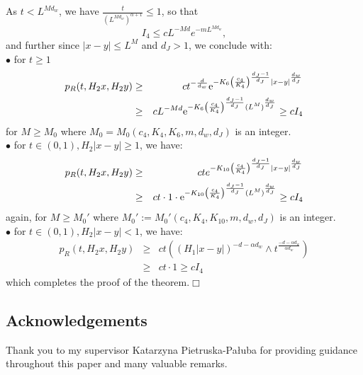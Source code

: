 \documentclass[11pt]{article}
\begin{document}
As $t < L^{Md_{w}}$, we have $\frac{t}{(L^{Md_{w}})^{\alpha + 1}} \leq 1$, so that
$$
I_4 \leq cL^{-Md}e^{-mL^{Md_w}},
$$
and further since $|x-y| \leq L^{M}$ and $d_J > 1$, we conclude with:\\
$\bullet$ for $ t\geq 1$
\begin{eqnarray*}
p_R(t,H_2x,H_2y) & \geq & ct^{-\frac{d}{d_{w}}}{\rm e}^{-K_6\left(\frac{c_4}{K_4}\right)^{\frac{d_J-1}{d_J}}|x-y|^{\frac{d_{w}}{d_{J}}}}\\
 & \geq & cL^{-Md}{\rm e}^{-K_6\left(\frac{c_4}{K_4}\right)^{\frac{d_J-1}{d_J}}(L^{M})^{\frac{d_{w}}{d_{J}}}}  \geq  cI_4
\end{eqnarray*}
for  $M \geq M_0$ where $M_0 = M_0(c_4, K_4, K_6, m, d_w, d_J)$ is an integer.\\
$\bullet$ for $ t \in (0,1), H_2|x-y| \geq 1$, we have:
\begin{eqnarray*}
p_R(t,H_2x,H_2y) & \geq & cte^{-K_{10}\left(\frac{c_4}{K_4}\right)^{\frac{d_J-1}{d_J}}|x-y|^{\frac{d_{w}}{d_{J}}}}\\
 & \geq & ct\cdot 1 \cdot {\rm e}^{-K_{10}\left(\frac{c_4}{K_4}\right)^{\frac{d_J-1}{d_J}}(L^{M})^{\frac{d_{w}}{d_{J}}}}  \geq  cI_4
\end{eqnarray*}
again, for $M \geq M_0'$ where $M_0' := M_0'(c_4, K_4, K_{10}, m, d_w, d_J)$ is an integer.\\
$\bullet$ for $ t \in (0,1), H_2|x-y| < 1$, we have:
\begin{eqnarray*}
p_R(t,H_2x,H_2y) & \geq & ct((H_1|x-y|)^{-d -\alpha d_{w}} \wedge t^{\frac{-d-\alpha d_{w}}{\alpha d_{w}}})\\
 & \geq & ct\cdot 1  \geq  cI_4
\end{eqnarray*}
which completes the proof of the theorem.\hfill$\Box$

\begin{center}
\section*{Acknowledgements}
\end{center}
Thank you to my supervisor Katarzyna Pietruska-Pa\l uba  for providing guidance throughout this paper and many valuable remarks.
\end{document}
